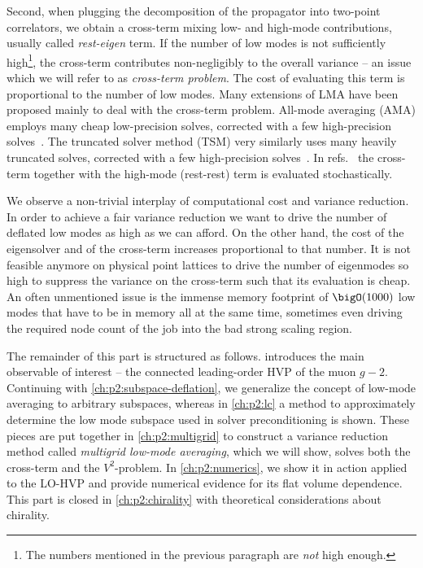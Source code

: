 Second, when plugging the decomposition of the propagator into two-point correlators, we obtain a cross-term mixing low- and high-mode contributions, usually called \emph{rest-eigen} term.
If the number of low modes is not sufficiently high\footnote{The numbers mentioned in the previous paragraph are \emph{not} high enough.}, the cross-term contributes non-negligibly to the overall variance -- an issue which we will refer to as \emph{cross-term problem}.
The cost of evaluating this term is proportional to the number of low modes.
Many extensions of LMA have been proposed mainly to deal with the cross-term problem.
All-mode averaging (AMA) employs many cheap low-precision solves, corrected with a few high-precision solves~\cite{Blum_2012,CAA,RBC_2018,Blum_2015}.
The truncated solver method (TSM) very similarly uses many heavily truncated solves, corrected with a few high-precision solves~\cite{bmw_2017,Kuberski:2023zky}.
In refs.~\cite{fermi_2023,lynch2023} the cross-term together with the high-mode (rest-rest) term is evaluated stochastically.

We observe a non-trivial interplay of computational cost and variance reduction.
In order to achieve a fair variance reduction we want to drive the number of deflated low modes as high as we can afford.
On the other hand, the cost of the eigensolver and of the cross-term increases proportional to that number.
It is not feasible anymore on physical point lattices to drive the number of eigenmodes so high to suppress the variance on the cross-term such that its evaluation is cheap.
An often unmentioned issue is the immense memory footprint of $\bigO(1000)$ low modes that have to be in memory all at the same time, sometimes even driving the required node count of the job into the bad strong scaling region.

The remainder of this part is structured as follows.
 introduces the main observable of interest -- the connected leading-order HVP of the muon $g-2$.
Continuing with \cref{ch:p2:subspace-deflation}, we generalize the concept of low-mode averaging to arbitrary subspaces, whereas in \cref{ch:p2:lc} a method to approximately determine the low mode subspace used in solver preconditioning is shown.
These pieces are put together in \cref{ch:p2:multigrid} to construct a variance reduction method called \emph{multigrid low-mode averaging}, which we will show, solves both the cross-term and the $V^{2}$-problem.
In \cref{ch:p2:numerics}, we show it in action applied to the LO-HVP and provide numerical evidence for its flat volume dependence.
This part is closed in \cref{ch:p2:chirality} with theoretical considerations about chirality.



